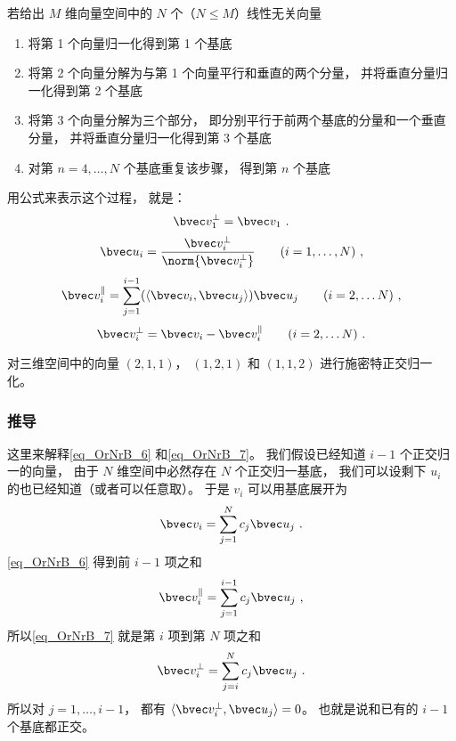 若给出 $M$ 维向量空间中的 $N$ 个（$N \leqslant M$）线性无关向量
\begin{enumerate}
\item 将第 1 个向量归一化得到第 1 个基底
\item 将第 2 个向量分解为与第 1 个向量平行和垂直的两个分量， 并将垂直分量归一化得到第 2 个基底
\item 将第 3 个向量分解为三个部分， 即分别平行于前两个基底的分量和一个垂直分量， 并将垂直分量归一化得到第 3 个基底
\item 对第 $n = 4, \dots , N$ 个基底重复该步骤， 得到第 $n$ 个基底
\end{enumerate}

用公式来表示这个过程， 就是：
\begin{equation}
\bvec v_1^\bot = \bvec v_1~.
\end{equation}
\begin{equation}
\bvec u_i = \frac{\bvec v_i^\bot}{\norm{\bvec v_i^\bot}} \qquad (i = 1, \dots ,N)~,
\end{equation}
\begin{equation}\label{eq_OrNrB_6}
\bvec v_i^\parallel = \sum _{j=1}^{i-1} (\langle \bvec v_i, \bvec u_j \rangle) \bvec u_j \qquad (i = 2, \dots N)~,
\end{equation}
\begin{equation}\label{eq_OrNrB_7}
\bvec v_i^\bot = \bvec v_i - \bvec v_i^\parallel \qquad (i = 2, \dots N)~.
\end{equation}

\begin{exercise}{}
对三维空间中的向量 $(2, 1, 1)$， $(1, 2, 1)$ 和 $(1, 1, 2)$ 进行施密特正交归一化。
\end{exercise}

\subsubsection{推导}
这里来解释\autoref{eq_OrNrB_6} 和\autoref{eq_OrNrB_7}。 我们假设已经知道 $i-1$ 个正交归一的向量， 由于 $N$ 维空间中必然存在 $N$ 个正交归一基底， 我们可以设剩下 $u_i$ 的也已经知道（或者可以任意取）。 于是 $v_i$ 可以用基底展开为
\begin{equation}
\bvec v_i = \sum _{j=1}^N c_j \bvec u_j~.
\end{equation}
\autoref{eq_OrNrB_6} 得到前 $i-1$ 项之和
\begin{equation}
\bvec v_i^\parallel = \sum _{j=1}^{i-1} c_j\bvec u_j~,
\end{equation}
所以\autoref{eq_OrNrB_7} 就是第 $i$ 项到第 $N$ 项之和
\begin{equation}
\bvec v_i^\bot = \sum _{j=i}^{N} c_j\bvec u_j~.
\end{equation}
所以对 $j = 1, \dots , i-1$， 都有 $\langle \bvec v_i^\bot, \bvec u_j \rangle = 0$。 也就是说和已有的 $i-1$ 个基底都正交。